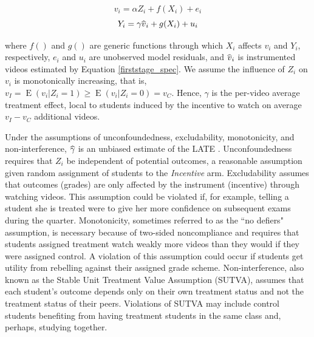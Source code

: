 \documentclass[12pt]{article}
\newcommand\wh[1]{\hstretch{2}{\hat{\hstretch{.5}{#1}}}}
\begin{document}
\begin{equation} \label{firststage_spec}
	v_i = \alpha Z_i + f(X_i) + e_i
\end{equation}
\begin{equation} \label{secondstage_spec}
	Y_i = \gamma \wh{v}_i + g(X_i) + u_i
\end{equation}

where $f()$ and $g()$ are generic functions through which $X_i$ affects $v_i$ and $Y_i$, respectively, $e_i$ and $u_i$ are unobserved model residuals, and $\wh{v}_i$ is instrumented videos estimated by Equation \ref{firststage_spec}. We assume the influence of $Z_i$ on $v_i$ is monotonically increasing, that is, $v_I = \operatorname{E}(v_i|Z_i=1) \geq \operatorname{E}(v_i|Z_i=0) = v_C$. Hence, $\gamma$ is the per-video average treatment effect, local to students induced by the incentive to watch on average $v_I - v_C$ additional videos.

Under the assumptions of unconfoundedness, excludability, monotonicity, and non-interference, $\wh{\gamma}$ is an unbiased estimate of the LATE \parencite{ai1995}. Unconfoundedness requires that $Z_i$ be independent of potential outcomes, a reasonable assumption given random assignment of students to the \textit{Incentive} arm. Excludability assumes that outcomes (grades) are only affected by the instrument (incentive) through watching videos. This assumption could be violated if, for example, telling a student she is treated were to give her more confidence on subsequent exams during the quarter. Monotonicity, sometimes referred to as the ``no defiers" assumption, is necessary because of two-sided noncompliance and requires that students assigned treatment watch weakly more videos than they would if they were assigned control. A violation of this assumption could occur if students get utility from rebelling against their assigned grade scheme. Non-interference, also known as the Stable Unit Treatment Value Assumption (SUTVA), assumes that each student's outcome depends only on their own treatment status and not the treatment status of their peers. Violations of SUTVA may include control students benefiting from having treatment students in the same class and, perhaps, studying together.
\end{document}
